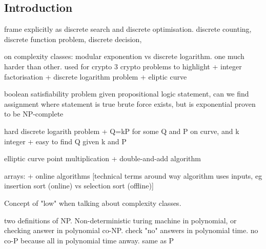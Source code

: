 
\subsection{Introduction}

frame explicitly as discrete search and discrete optimisation. discrete counting, discrete function problem, discrete decision,

on complexity classes: modular exponention vs discrete logarithm. one much harder than other. used for crypto
3 crypto problems to highlight
+ integer factorisation
+ discrete logarithm problem
+ eliptic curve

boolean satisfiability problem
given propositional logic statement, can we find assignment where statement is true
brute force exists, but is exponential
proven to be NP-complete

hard discrete logarith problem
+ Q=kP for some Q and P on curve, and k integer
+ easy to find Q given k and P

elliptic curve point multiplication
+ double-and-add algorithm

arrays:
+ online algorithms [technical terms around way algorithm uses inputs, eg insertion sort (online) vs selection sort (offline)]

Concept of "low" when talking about complexity classes.

two definitions of NP. Non-deterministic turing machine in polynomial, or checking answer in polynomial
co-NP. check "no" answers in polynomial time. no co-P because all in polynomial time anway. same as P



